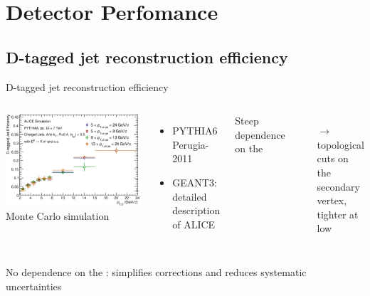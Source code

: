 \documentclass[xcolor={usenames,dvipsnames}]{beamer}
\begin{document}
\section{Detector Perfomance}

\subsection{D-tagged jet reconstruction efficiency}
\begin{frame}{D-tagged jet reconstruction efficiency}

\begin{columns}
\includegraphics[width=\textwidth]{img/HQ16_Simulation_EfficiencyVsDPt}
Monte Carlo simulation
\begin{itemize}
\item PYTHIA6 Perugia-2011
\item GEANT3: detailed description of ALICE
\end{itemize}
\bigskip
\alert{Steep dependence on the \ptd}
\begin{itemize}
\item[$\rightarrow$] topological cuts on the secondary vertex, tighter at low \ptd\
\end{itemize}
\end{columns}
\bigskip
\alert{No dependence on the \ptchjet}: simplifies corrections and reduces systematic uncertainties 
\end{frame}
\end{document}
